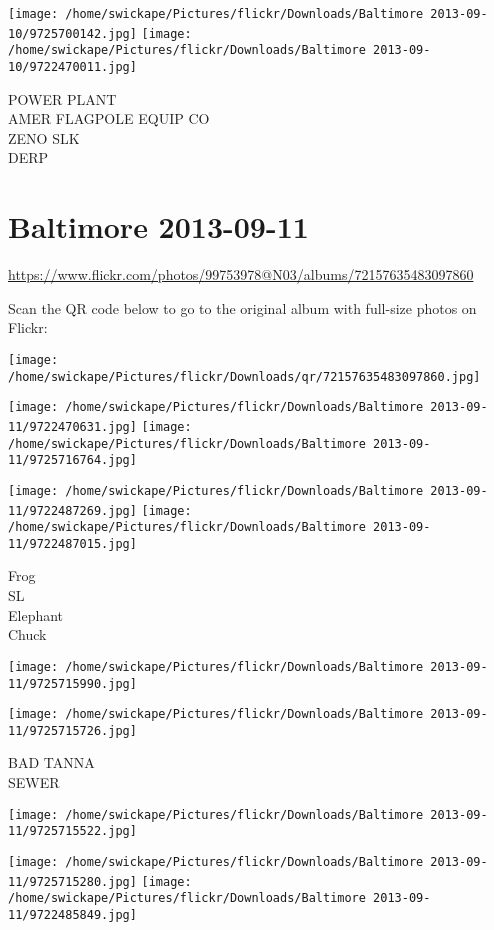 \documentclass[10pt,letterpaper]{article}
\begin{document}
\texttt{[image: /home/swickape/Pictures/flickr/Downloads/Baltimore 2013-09-10/9725700142.jpg]}
\texttt{[image: /home/swickape/Pictures/flickr/Downloads/Baltimore 2013-09-10/9722470011.jpg]}

POWER PLANT\\
AMER FLAGPOLE EQUIP CO\\
ZENO SLK\\
DERP
\pagebreak

\section*{Baltimore 2013-09-11}

\url{https://www.flickr.com/photos/99753978@N03/albums/72157635483097860}

Scan the QR code below to go to the original album with full-size photos on Flickr:

\texttt{[image: /home/swickape/Pictures/flickr/Downloads/qr/72157635483097860.jpg]}
\pagebreak

\texttt{[image: /home/swickape/Pictures/flickr/Downloads/Baltimore 2013-09-11/9722470631.jpg]}
\texttt{[image: /home/swickape/Pictures/flickr/Downloads/Baltimore 2013-09-11/9725716764.jpg]}

\texttt{[image: /home/swickape/Pictures/flickr/Downloads/Baltimore 2013-09-11/9722487269.jpg]}
\texttt{[image: /home/swickape/Pictures/flickr/Downloads/Baltimore 2013-09-11/9722487015.jpg]}

Frog\\
SL\\
Elephant\\
Chuck
\pagebreak

\texttt{[image: /home/swickape/Pictures/flickr/Downloads/Baltimore 2013-09-11/9725715990.jpg]}

\vspace{0.25in}
\texttt{[image: /home/swickape/Pictures/flickr/Downloads/Baltimore 2013-09-11/9725715726.jpg]}

BAD TANNA\\
SEWER
\pagebreak

\texttt{[image: /home/swickape/Pictures/flickr/Downloads/Baltimore 2013-09-11/9725715522.jpg]}

\vspace{0.25in}
\texttt{[image: /home/swickape/Pictures/flickr/Downloads/Baltimore 2013-09-11/9725715280.jpg]}
\texttt{[image: /home/swickape/Pictures/flickr/Downloads/Baltimore 2013-09-11/9722485849.jpg]}
\end{document}
